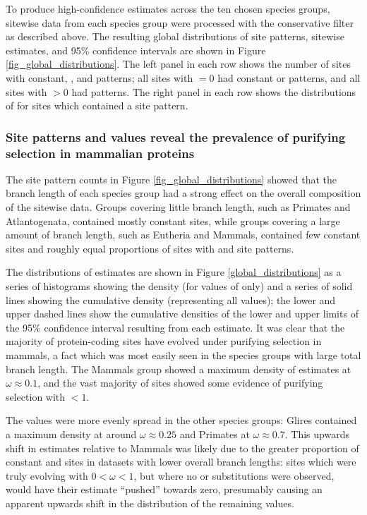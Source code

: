 To produce high-confidence \sw estimates across the ten chosen species
groups, sitewise data from each species group were processed with the
conservative filter as described above. The resulting global
distributions of site patterns, sitewise \omgml estimates, and 95\%
confidence intervals are shown in Figure
\ref{fig_global_distributions}. The left panel in each row shows the
number of sites with constant, \syn, and \nsyn patterns; all sites
with \omgml$=0$ had constant or \syn patterns, and all sites with
\omgml$>0$ had \nsyn patterns. The right panel in each row shows the
distributions of \omgml for sites which contained a \nsyn site
pattern.

\subsubsection{Site patterns and \omgml values reveal the prevalence of purifying selection in mammalian proteins}

The site pattern counts in Figure \ref{fig_global_distributions}
showed that the branch length of each species group had a strong
effect on the overall composition of the sitewise data. Groups
covering little branch length, such as Primates and Atlantogenata,
contained mostly constant sites, while groups covering a large amount
of branch length, such as Eutheria and Mammals, contained few constant
sites and roughly equal proportions of sites with \syn and \nsyn site
patterns.

The distributions of \omgml estimates are shown in Figure
\ref{global_distributions} as a series of histograms showing the
\omgml density (for \nz values of \omgml only) and a series of solid
lines showing the cumulative \omgml density (representing all values);
the lower and upper dashed lines show the cumulative densities of the
lower and upper limits of the 95\% confidence interval resulting from
each \sw estimate. It was clear that the majority of protein-coding
sites have evolved under purifying selection in mammals, a fact which
was most easily seen in the species groups with large total branch
length. The Mammals group showed a maximum density of \nz \omgml
estimates at $\omega\approx0.1$, and the vast majority of sites showed
some evidence of purifying selection with \omgml$<1$.

The \nz \omgml values were more evenly spread in the other species
groups: Glires contained a maximum \nz \omgml density at around
$\omega\approx0.25$ and Primates at $\omega\approx0.7$. This upwards
shift in \nz \omgml estimates relative to Mammals was likely due to
the greater proportion of constant and \syn sites in datasets with
lower overall branch lengths: sites which were truly evolving with
$0<\omega<1$, but where no \nsyn or \syn substitutions were observed,
would have their \omgml estimate ``pushed'' towards zero, presumably
causing an apparent upwards shift in the distribution of the remaining
\nz \omgml values.

